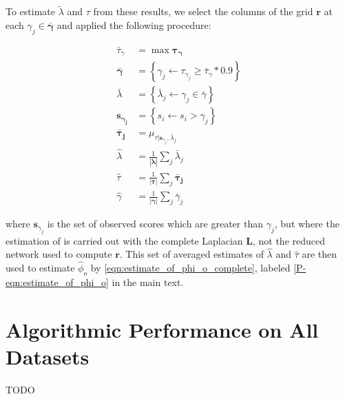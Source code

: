 \documentclass{article}
\begin{document}
        To estimate ${\tilde \lambda}$ and $\tau$ from these results,
    we select the columns of the grid $\mathbf{r}$ at each $\gamma_j
    \in \mathbf{{\bar \gamma}}$ and applied the following procedure:

    \begin{align}
    {\bar \tau_\gamma} &= \max{\mathbf{\tau_\gamma}}\\
    \mathbf{\bar \gamma} &= \left\{\gamma_j \leftarrow\tau_{\gamma_j}
        \ge {\bar \tau_\gamma} * 0.9\right\}\\
    {\bar \lambda} &= \left\{ {\bar \lambda_j} \leftarrow \gamma_j \in {\bar \gamma}\right\}\\
    \mathbf{s_{\gamma_j}} &= \left\{s_i \leftarrow s_i > \gamma_j\right\} \\
    \mathbf{{\bar \tau_j}} &= \mu_{\tau|\mathbf{s}_{\gamma_j}, {\bar \lambda}_j}\\
    {\hat \lambda} &= \frac{1}{|\mathbf{{\bar \lambda}}|}\sum_j {\bar \lambda}_j\\
    {\hat \tau} &= \frac{1}{|\mathbf{{\bar \tau}}|}\sum_j \mathbf{{\bar \tau_j}}\\
    {\hat \gamma} &= \frac{1}{|\mathbf{{\bar \gamma}}|}\sum_j {\bar \gamma}_j
    \end{align}

    \noindent where $\mathbf{s}_{\gamma_j}$ is the set of observed
    scores which are greater than $\gamma_j$, but where the estimation
    of is carried out with the complete Laplacian $\mathbf{L}$,
    not the reduced network used to compute $\mathbf{r}$. This set of
    averaged estimates of ${\hat \lambda}$ and ${\hat \tau}$ are then
    used to estimate ${\hat \phi_o}$ by \ref{eqn:estimate_of_phi_o_complete}, labeled
    \ref{P-eqn:estimate_of_phi_o} in the main text.

\section{Algorithmic Performance on All Datasets}\label{sec:algorithm_performance}
TODO



\end{document}
